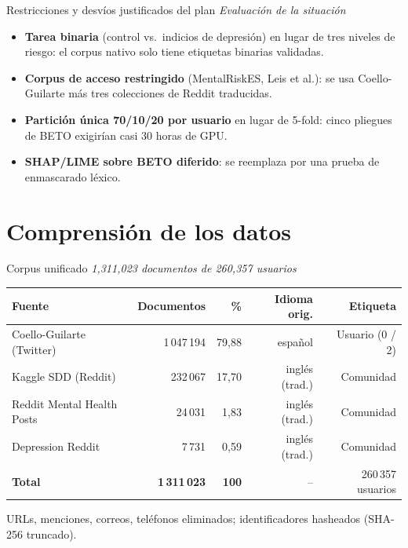 ﻿\documentclass[11pt,aspectratio=169]{beamer}
\newcommand{\ugrsubtitle}[1]{%
  \vskip-0.25cm
  \small\textcolor{ugrGris}{\emph{#1}}\par
  \vskip0.15cm
}
\newcommand{\ugrblock}[2]{
  \begin{tcolorbox}[
    enhanced, colback=ugrFondoClaro, colframe=ugrAzul, boxrule=0.8pt, arc=3pt,
    title={\textbf{#1}}, fonttitle=\small\bfseries, coltitle=white, colbacktitle=ugrAzul,
    left=6pt, right=6pt, top=2pt, bottom=2pt, before skip=0.3em, after skip=0.2em
  ]
    #2
  \end{tcolorbox}
}
\begin{document}
\begin{frame}{Restricciones y desvíos justificados del plan}
  \ugrsubtitle{Evaluación de la situación}
  \begin{itemize}
    \item \textbf{Tarea binaria} (control vs.\ indicios de depresión) en lugar de tres niveles de riesgo: el corpus nativo solo tiene etiquetas binarias validadas.
    \item \textbf{Corpus de acceso restringido} (MentalRiskES, Leis et al.): se usa Coello-Guilarte más tres colecciones de Reddit traducidas.
    \item \textbf{Partición única 70/10/20 por usuario} en lugar de 5-fold: cinco pliegues de BETO exigirían casi 30 horas de GPU.
    \item \textbf{SHAP/LIME sobre BETO diferido}: se reemplaza por una prueba de enmascarado léxico.
  \end{itemize}
\end{frame}

\section{Comprensión de los datos}
\begin{frame}{Corpus unificado}
  \small
  \ugrsubtitle{1,311,023 documentos de 260,357 usuarios}
  \begin{table}
    \centering\small
    \setlength{\tabcolsep}{4pt}
    \begin{tabular}{lrrrr}
      \toprule
      \textbf{Fuente} & \textbf{Documentos} & \textbf{\%} & \textbf{Idioma orig.} & \textbf{Etiqueta} \\
      \midrule
      Coello-Guilarte (Twitter) & 1\,047\,194 & 79{,}88 & español & Usuario (0 / 2) \\
      Kaggle SDD (Reddit) & 232\,067 & 17{,}70 & inglés (trad.) & Comunidad \\
      Reddit Mental Health Posts & 24\,031 & 1{,}83 & inglés (trad.) & Comunidad \\
      Depression Reddit & 7\,731 & 0{,}59 & inglés (trad.) & Comunidad \\
      \midrule
      \textbf{Total} & \textbf{1\,311\,023} & \textbf{100} & -- & 260\,357 usuarios \\
      \bottomrule
    \end{tabular}
  \end{table}
  \ugrblock{Anonimización}{
    URLs, menciones, correos, teléfonos eliminados; identificadores hasheados (SHA-256 truncado).
  }
\end{frame}
\end{document}
